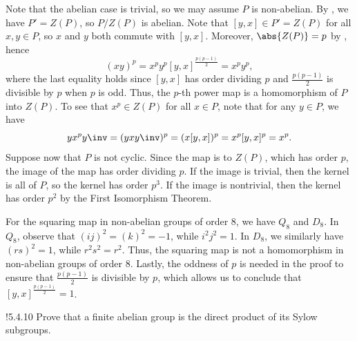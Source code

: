 \begin{sol}
    Note that the abelian case is trivial, so we may assume $P$ is non-abelian.
	By , we have $P' = Z(P)$, so $P/Z(P)$ is abelian.
	Note that $[y, x] \in P' = Z(P)$ for all $x, y \in P$, so $x$ and $y$ both commute with $[y, x]$.
	Moreover, $\abs{Z(P)} = p$ by , hence
    \[
    	(xy)^p = x^p y^p [y, x]^{\frac{p(p-1)}{2}} = x^p y^p,
    \]
    where the last equality holds since $[y, x]$ has order dividing $p$ and $\frac{p(p-1)}{2}$ is divisible by $p$ when $p$ is odd.
	Thus, the $p$-th power map is a homomorphism of $P$ into $Z(P)$.
	To see that $x^p \in Z(P)$ for all $x \in P$, note that for any $y \in P$, we have
    \[
    	y x^py\inv = (y x y\inv)^p = (x [y, x])^p = x^p [y, x]^p = x^p.
    \]
    Suppose now that $P$ is not cyclic.
	Since the map is to $Z(P)$, which has order $p$, the image of the map has order dividing $p$.
	If the image is trivial, then the kernel is all of $P$, so the kernel has order $p^3$.
	If the image is nontrivial, then the kernel has order $p^2$ by the First Isomorphism Theorem.

    For the squaring map in non-abelian groups of order 8, we have $Q_8$ and $D_8$.
	In $Q_8$, observe that $(ij)^2 = (k)^2 = -1$, while $i^2j^2 = 1$.
	In $D_8$, we similarly have $(rs)^2 = 1$, while $r^2s^2 = r^2$.
	Thus, the squaring map is not a homomorphism in non-abelian groups of order 8.
	Lastly, the oddness of $p$ is needed in the proof to ensure that $\frac{p(p-1)}{2}$ is divisible by $p$, which allows us to conclude that $[y, x]^{\frac{p(p-1)}{2}} = 1$.
\end{sol}

\begin{exercise}!{5.4.10}
    Prove that a finite abelian group is the direct product of its Sylow subgroups.
\end{exercise}

